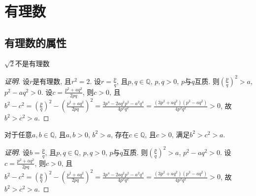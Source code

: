 \chapter{有理数}

\section{有理数的属性}

\begin{proposition}
	$\sqrt{2}$不是有理数
\end{proposition}

\begin{proof}[证明]
	设$r$是有理数, 且$r^2=2$. 设$r=\frac{p}{q}$, 且$p,q\in \mathbb{Q}$, $p,q>0$, $p$与$q$互质. 则$(\frac{p}{q})^2>a$, $p^2-aq^2>0$. 设$c=\frac{p^2+aq^2}{2pq}$, 则$c>0$, 且$b^2-c^2=(\frac{p}{q})^2-(\frac{p^2+aq^2}{2pq})^2=\frac{3p^4-2aq^2p^2-a^2q^4}{4p^2q^2}=\frac{(3p^2+aq^2)(p^2-aq^2)}{4p^2q^2}>0$, 故$b^2>c^2>a$.
\end{proof}

\begin{proposition}[平方根的不可趋近性]
	对于任意$a, b\in \mathbb{Q}$, 且$a,b>0$, $b^2>a$, 存在$c\in \mathbb{Q}$, 且$c>0$, 满足$b^2>c^2>a$.
\end{proposition}

\begin{proof}[证明]
	设$b=\frac{p}{q}$, 且$p,q\in \mathbb{Q}$, $p,q>0$, $p$与$q$互质. 则$(\frac{p}{q})^2>a$, $p^2-aq^2>0$. 设$c=\frac{p^2+aq^2}{2pq}$, 则$c>0$, 且$b^2-c^2=(\frac{p}{q})^2-(\frac{p^2+aq^2}{2pq})^2=\frac{3p^4-2aq^2p^2-a^2q^4}{4p^2q^2}=\frac{(3p^2+aq^2)(p^2-aq^2)}{4p^2q^2}>0$, 故$b^2>c^2>a$.
\end{proof}
